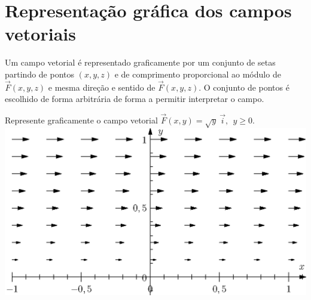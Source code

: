 \section{Representação gráfica dos campos vetoriais}
Um campo vetorial é representado graficamente por um conjunto de setas partindo de pontos $(x,y,z)$ e de comprimento proporcional ao módulo de $\vec{F}(x,y,z)$ e mesma direção e sentido de $\vec{F}(x,y,z)$. O conjunto de pontos é escolhido de forma arbitrária de forma a permitir interpretar o campo.  

\begin{ex} Represente graficamente o campo vetorial $\vec{F}(x,y)=\sqrt{y}\ \!\vec{i},~~y\geq 0$.
\includegraphics{cap_campos/figs/campo_exemplo_1}
\end{ex}


